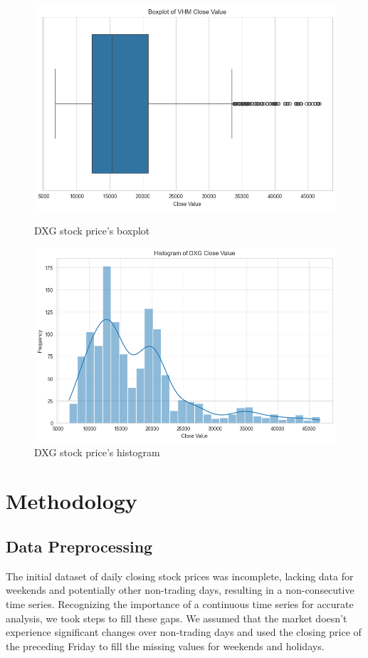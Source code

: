 \documentclass{ieeeojies}
\begin{document}
\begin{figure}[H]
  \centering
  \begin{minipage}{0.23\textwidth}
  \centering
  \includegraphics[width=1\textwidth]{bibliography/Figure/DXGBoxPlot.png}
  \caption{DXG stock price's boxplot}
  \label{fig:1}
  \end{minipage}
  \hfill
  \begin{minipage}{0.23\textwidth}
  \centering
  \includegraphics[width=1\textwidth]{bibliography/Figure/DXGHistogram.png}
  \caption{DXG stock price's histogram}
  \label{fig:2}
  \end{minipage}
\end{figure}


\section{Methodology}
\subsection{Data Preprocessing}
The initial dataset of daily closing stock prices was incomplete, lacking data for weekends and potentially other non-trading days, resulting in a non-consecutive time series. Recognizing the importance of a continuous time series for accurate analysis, we took steps to fill these gaps. We assumed that the market doesn't experience significant changes over non-trading days and used the closing price of the preceding Friday to fill the missing values for weekends and holidays.
\end{document}
